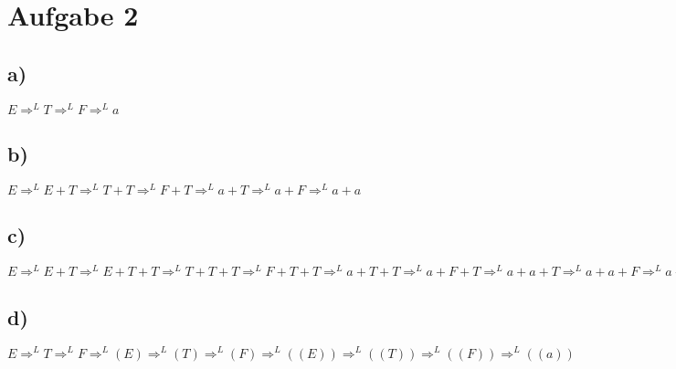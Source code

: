 \section*{Aufgabe 2}

\subsection*{a)}
$ E \Rightarrow^L T \Rightarrow^L F \Rightarrow^L a $
\subsection*{b)}
$ E \Rightarrow^L E+T \Rightarrow^L T+T \Rightarrow^L F+T \Rightarrow^L a+T \Rightarrow^L a+F \Rightarrow^L a+a $
\subsection*{c)}
$ E \Rightarrow^L E+T \Rightarrow^L E+T+T \Rightarrow^L  T+T+T \Rightarrow^L  F+T+T \Rightarrow^L  a+T+T \Rightarrow^L  a+F+T \Rightarrow^L a+a+T \Rightarrow^L a+a+F \Rightarrow^L a+a+a $
\subsection*{d)}
$ E \Rightarrow^L T \Rightarrow^L F \Rightarrow^L (E)  \Rightarrow^L (T) \Rightarrow^L (F) \Rightarrow^L ((E)) \Rightarrow^L ((T)) \Rightarrow^L ((F)) \Rightarrow^L ((a)) $
